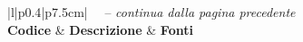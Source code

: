 ﻿\documentclass[a4paper,12pt]{article}
\begin{document}
{{\begin{longtable}{|l|p{}|p{7.5cm}|}
            {\tablename\ \thetable\ -- \textit{continua dalla pagina precedente}}                                                                                                                                                                                                               \\
            \hline
            \textbf{Codice} & \textbf{Descrizione}                                                                                                                          & \textbf{Fonti}                                                                                                    \\
            \hline
            \endhead

            \hline
                                                                                                                                                                                                                                   \\
            \endfoot


\end{longtable}}}
\end{document}
